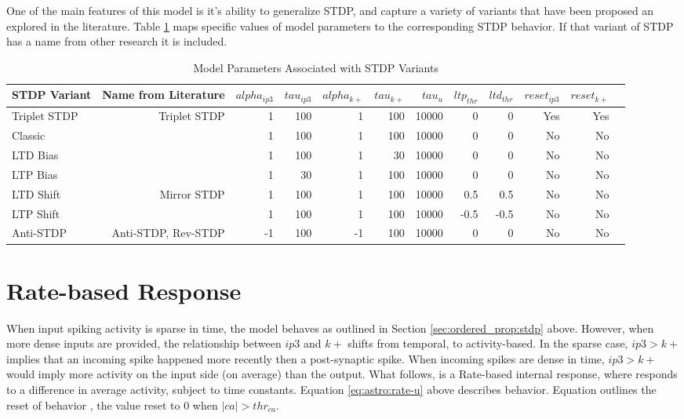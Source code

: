 One of the main features of this model is it's ability to generalize STDP,
and capture a variety of variants that have been proposed an explored in the
literature. Table \ref{table:astro_varient_params} maps specific values of
model parameters to the corresponding STDP behavior. If that
variant of STDP has a name from other research it is included.

\begin{table}[!htp]\centering
\caption{Model Parameters Associated with STDP Variants} \label{table:astro_varient_params}
\scriptsize
\begin{tabular}{lrrrrrrrrrrr}\toprule
STDP Variant &Name from Literature &$alpha_{ip3}$ &$tau_{ip3}$ &$alpha_{k+}$ &$tau_{k+}$ &$tau_u$ &$ltp_{thr}$ &$ltd_{thr}$ &$reset_{ip3}$ &$reset_{k+}$ \\\midrule
Triplet STDP &Triplet STDP &1 &100 &1 &100 &10000 &0 &0 &Yes &Yes \\
Classic & &1 &100 &1 &100 &10000 &0 &0 &No &No \\
LTD Bias & &1 &100 &1 &30 &10000 &0 &0 &No &No \\
LTP Bias & &1 &30 &1 &100 &10000 &0 &0 &No &No \\
LTD Shift &Mirror STDP &1 &100 &1 &100 &10000 &0.5 &0.5 &No &No \\
LTP Shift & &1 &100 &1 &100 &10000 &-0.5 &-0.5 &No &No \\
Anti-STDP &Anti-STDP, Rev-STDP &-1 &100 &-1 &100 &10000 &0 &0 &No &No \\
\bottomrule
\end{tabular}
\end{table}

\section{Rate-based Response} \label{sec:rate_response}

When input spiking activity is sparse in time, the model behaves as outlined
in Section \ref{sec:ordered_prop:stdp} above. However, when more dense
inputs are provided, the relationship between $ip3$ and $k+$ shifts from
temporal, to activity-based. In the sparse case, $ip3 > k+$ implies that an
incoming spike happened more recently then a post-synaptic spike. When
incoming spikes are dense in time, $ip3 > k+$ would imply more activity on
the input side (on average) than the output. What follows, is a Rate-based
internal response, where \ca responds to a difference in average activity,
subject to time constants. Equation \ref{eq:astro:rate-u} above describes \ca
behavior. Equation \label{eq:astro:u-reset} outlines the reset of behavior \ca,
the value reset to $0$ when $|ca| > thr_{ca}$.

